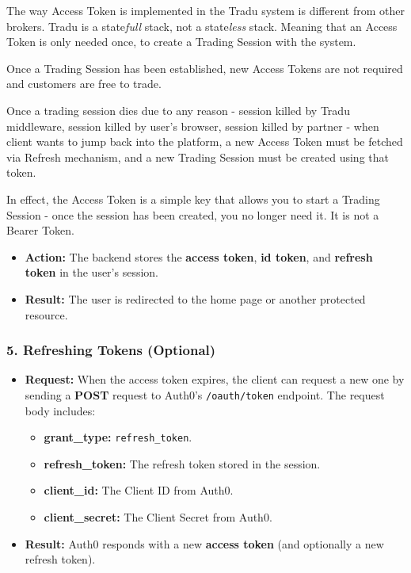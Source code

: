 \documentclass[11pt]{article}
\begin{document}
The way Access Token is implemented in the Tradu system is different from
other brokers. Tradu is a state\textit{full} stack, not a state\textit{less} stack. Meaning that an Access Token is only needed once, to create a Trading Session with the system. 

Once a Trading Session has been established, new Access Tokens are not required and customers
are free to trade.

Once a trading session dies due to any reason - session killed by Tradu middleware,
session killed by user’s browser, session killed by partner - when client wants to jump
back into the platform, a new Access Token must be fetched via Refresh mechanism,
and a new Trading Session must be created using that token.

In effect, the Access Token is a simple key that allows you to start a Trading Session -
once the session has been created, you no longer need it. It is not a Bearer Token.

\begin{itemize}
    \item \textbf{Action:} The backend stores the \textbf{access token}, \textbf{id token}, and \textbf{refresh token} in the user's session.
    \item \textbf{Result:} The user is redirected to the home page or another protected resource.
\end{itemize}

\subsubsection*{5. \textbf{Refreshing Tokens (Optional)}}
\begin{itemize}
    \item \textbf{Request:} When the access token expires, the client can request a new one by sending a \textbf{POST} request to Auth0's \texttt{/oauth/token} endpoint. The request body includes:
          \begin{itemize}
              \item \textbf{grant\_type:} \texttt{refresh\_token}.
              \item \textbf{refresh\_token:} The refresh token stored in the session.
              \item \textbf{client\_id:} The Client ID from Auth0.
              \item \textbf{client\_secret:} The Client Secret from Auth0.
          \end{itemize}
    \item \textbf{Result:} Auth0 responds with a new \textbf{access token} (and optionally a new refresh token).
\end{itemize}
\end{document}
